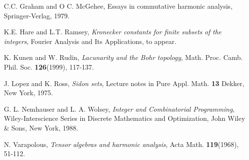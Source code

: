 \documentclass{amsart}
\begin{document}
\begin{thebibliography}{99}
 C.C. Graham and O C. McGehee, Essays in commutative harmonic
analysis, Springer-Verlag, 1979.

 K.E. Hare and L.T. Ramsey, \textit{Kronecker constants for finite subsets of the integers}, Fourier Analysis and Its Applications, to appear.

 K. Kunen and W. Rudin, \textit{Lacunarity and the Bohr topology}, Math. Proc. Camb. Phil. Soc. \textbf{126}(1999), 117-137.

 J. Lopez and K. Ross, \textit{Sidon sets}, Lecture notes in
Pure Appl. Math. \textbf{13} Dekker, New York, 1975.

 G. L. Nemhauser and L. A. Wolsey, \textit{Integer and
Combinatorial Programming}, Wiley-Interscience Series in Discrete
Mathematics and Optimization, John Wiley \& Sons, New York, 1988.

 N. Varapolous, \textit{Tensor algebras and harmonic analysis},
Acta Math. \textbf{119}(1968), 51-112.
\end{thebibliography}
\end{document}

